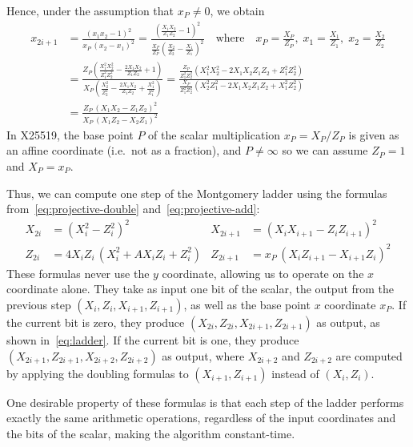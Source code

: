 \documentclass[manuscript]{acmart}
\begin{document}
Hence, under the assumption that $x_P \ne 0$, we obtain
\begin{align}
x_{2i+1} &= \frac{(x_1 x_2 - 1)^2}{x_P\,(x_2 - x_1)^2}
    = \frac{\left(\frac{X_1 X_2}{Z_1 Z_2} - 1\right)^2}{\frac{X_P}{Z_P} \left(\frac{X_2}{Z_2} - \frac{X_1}{Z_1}\right)^2}
    \quad\text{where}\quad x_P = \frac{X_P}{Z_P},\; x_1 = \frac{X_1}{Z_1},\; x_2 = \frac{X_2}{Z_2} \nonumber\\[5pt]
&= \frac{Z_P \left(\frac{X_1^2 X_2^2}{Z_1^2 Z_2^2} - \frac{2X_1 X_2}{Z_1 Z_2} + 1\right)}{X_P \left(\frac{X_2^2}{Z_2^2} - \frac{2X_1 X_2}{Z_1 Z_2} + \frac{X_1^2}{Z_1^2}\right)}
= \frac{\frac{Z_P}{Z_1^2 Z_2^2} \left(X_1^2 X_2^2 - 2X_1 X_2 Z_1 Z_2 + Z_1^2 Z_2^2\right)}{\frac{X_P}{Z_1^2 Z_2^2} \left(X_2^2 Z_1^2 - 2X_1 X_2 Z_1 Z_2 + X_1^2 Z_2^2\right)} \nonumber\\[5pt]
    &= \frac{Z_P\,(X_1 X_2 - Z_1 Z_2)^2}{X_P\,(X_1 Z_2 - X_2 Z_1)^2} \label{eq:projective-add}
\end{align}
In X25519, the base point $P$ of the scalar multiplication $x_P = X_P/Z_P$ is given as an affine coordinate (i.e.\ not as a fraction), and $P \ne \infty$ so we can assume $Z_P=1$ and $X_P=x_P$.

Thus, we can compute one step of the Montgomery ladder using the formulas from~\eqref{eq:projective-double} and~\eqref{eq:projective-add}:
\begin{align}
X_{2i} &= (X_i^2 - Z_i^2)^2 &
X_{2i+1} &= (X_i X_{i+1} - Z_i Z_{i+1})^2 \label{eq:ladder-step}\\
Z_{2i} &= 4X_i Z_i\,(X_i^2 + AX_i Z_i + Z_i^2) &
Z_{2i+1} &= x_P\,(X_i Z_{i+1} - X_{i+1} Z_i)^2 \nonumber
\end{align}
These formulas never use the $y$ coordinate, allowing us to operate on the $x$ coordinate alone.
They take as input one bit of the scalar, the output from the previous step $(X_i, Z_i, X_{i+1}, Z_{i+1})$, as well as the base point $x$ coordinate $x_P$.
If the current bit is zero, they produce $(X_{2i}, Z_{2i}, X_{2i+1}, Z_{2i+1})$ as output, as shown in~\eqref{eq:ladder}.
If the current bit is one, they produce $(X_{2i+1}, Z_{2i+1}, X_{2i+2}, Z_{2i+2})$ as output, where $X_{2i+2}$ and $Z_{2i+2}$ are computed by applying the doubling formulas to $(X_{i+1}, Z_{i+1})$ instead of $(X_i, Z_i)$.

One desirable property of these formulas is that each step of the ladder performs exactly the same arithmetic operations, regardless of the input coordinates and the bits of the scalar, making the algorithm constant-time.
\end{document}
